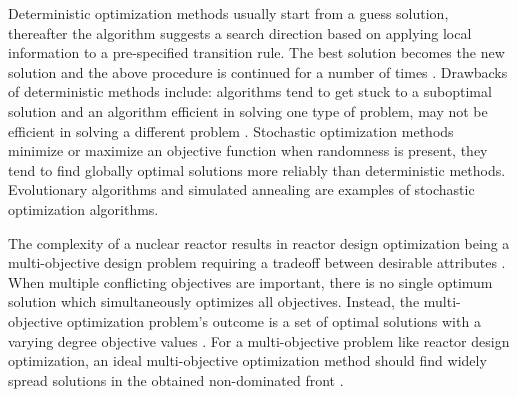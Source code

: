 Deterministic optimization methods usually start from a guess solution, 
thereafter the algorithm suggests a search direction based on applying local 
information to a pre-specified transition rule. 
The best solution becomes the new solution and the above procedure is continued 
for a number of times \cite{deb_multi-objective_2001}. 
Drawbacks of deterministic methods include: algorithms tend to get stuck to a 
suboptimal solution and an algorithm efficient in solving one type of problem, 
may not be efficient in solving a different problem \cite{deb_multi-objective_2001}. 
Stochastic optimization methods minimize or maximize an objective function 
when randomness is present, they tend to find globally optimal solutions 
more reliably than deterministic methods. 
Evolutionary algorithms and simulated annealing are examples of stochastic 
optimization algorithms. 

The complexity of a nuclear reactor results in reactor design optimization 
being a multi-objective design problem requiring a tradeoff between desirable 
attributes \cite{byrne_evolving_2014,simon_sciences_2019}. 
When multiple conflicting objectives are important, there is no single optimum 
solution which simultaneously optimizes all objectives. 
Instead, the multi-objective optimization problem's outcome is a set of optimal 
solutions with a varying degree objective values \cite{deb_multi-objective_2001}. 
For a multi-objective problem like reactor design optimization, 
an ideal multi-objective optimization method should find widely spread solutions 
in the obtained non-dominated front \cite{deb_multi-objective_2001}. 

